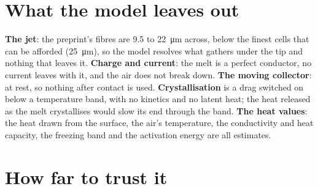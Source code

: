 \documentclass[10pt,a4paper]{article}
\begin{document}
\section{What the model leaves out}
\textbf{The jet}: the preprint's fibres are 9.5 to \qty{22}{\micro\metre} across, below the finest cells
that can be afforded (\qty{25}{\micro\metre}), so the model resolves what gathers under the tip and nothing
that leaves it. \textbf{Charge and current}: the melt is a perfect conductor, no current leaves with it, and
the air does not break down. \textbf{The moving collector}: at rest, so nothing after contact is used.
\textbf{Crystallisation} is a drag switched on below a temperature band, with no kinetics and no latent
heat; the heat released as the melt crystallises would slow its end through the band.
\textbf{The heat values}: the heat drawn from the surface, the air's temperature, the conductivity and heat
capacity, the freezing band and the activation energy are all estimates.

\section{How far to trust it}
\end{document}
